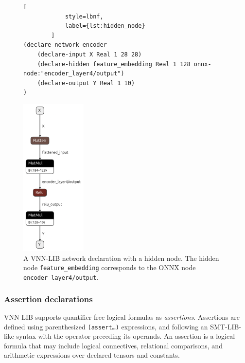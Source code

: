 \begin{figure}[htbp]
    \begin{minipage}[c]{0.55\textwidth}
        \begin{lstlisting}[
            style=lbnf,
            label={lst:hidden_node}
        ]
(declare-network encoder
    (declare-input X Real 1 28 28)
    (declare-hidden feature_embedding Real 1 128 onnx-node:"encoder_layer4/output")
    (declare-output Y Real 1 10)
)
        \end{lstlisting}
    \end{minipage}%
    \begin{minipage}[c]{0.45\textwidth}
        \centering
        \includegraphics[height=8cm]{imgs/encoder_net.onnx.png}
    \end{minipage}
    \caption{A VNN-LIB network declaration with a hidden node. The hidden node \texttt{feature\_embedding} corresponds to the ONNX node \texttt{encoder\_layer4/output}.}
    \label{fig:hidden_node}
\end{figure}

\subsubsection*{Assertion declarations}
\label{sec:assertion-declarations}
VNN-LIB supports quantifier-free logical formulas as \textit{assertions}. Assertions are defined using parenthesized \texttt{(assert\ldots)} expressions, and following an SMT-LIB-like syntax with the 
operator preceding its operands. An assertion is a logical formula that may include logical connectives, relational comparisons, and arithmetic expressions over declared tensors and constants.

